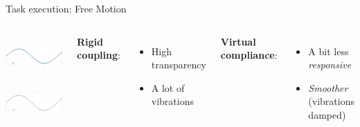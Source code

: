\documentclass[10pt]{beamer}
\begin{document}
\begin{frame}{Task execution:  Free Motion}
  \begin{columns}
    \includegraphics[width=\textwidth,
    height=0.45\textwidth]{../reportTeleop/Images/rCoupFreeTot50htznoise}\\
    \smallskip
    \includegraphics[width=\textwidth,
    height=0.45\textwidth]{../reportTeleop/Images/set20freeTot50Htznoise}

    \textbf{Rigid coupling}:\\
    \begin{itemize}
    \item{High transparency}
    \item{A lot of vibrations}
    \end{itemize}
    \smallskip

    \textbf{Virtual compliance}:\\
    \begin{itemize}
    \item{ A bit less \textsl{responsive}}
    \item{\textsl{Smoother} (vibrations damped)}
    \end{itemize}
  \end{columns}
\end{frame}
\end{document}
